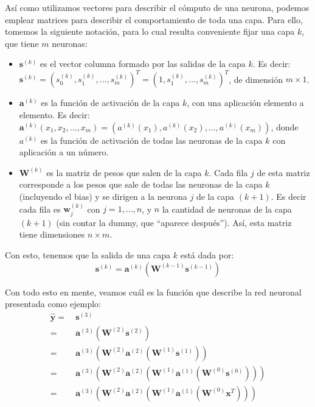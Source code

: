 \documentclass[../../main.tex]{subfiles}
\begin{document}
Así como utilizamos vectores para describir el cómputo de una neurona, podemos emplear
matrices para describir el comportamiento de toda una capa. Para ello, tomemos la siguiente
notación, para lo cual resulta conveniente fijar una capa \(k\), que tiene \(m\)
neuronas:
\begin{itemize}[itemsep=0.1cm]
    \item \(\bm{s}^{(k)}\) es el vector columna formado por las salidas de la capa
    \(k\). Es decir: \(\bm{s}^{(k)} = (s_0^{(k)}, s_1^{(k)}, ..., s_m^{(k)})^T = (1,
    s_1^{(k)}, ..., s_m^{(k)})^T\), de dimensión \(m \times 1\).
    \item \(\bm{a}^{(k)}\) es la función de activación de la capa \(k\), con una aplicación
    elemento a elemento. Es decir: \(\bm{a}^{(k)}(x_1, x_2, ..., x_m) = (a^{(k)}(x_1),
    a^{(k)}(x_2), ..., a^{(k)}(x_m))\), donde \(a^{(k)}\) es la función de activación
    de todas las neuronas de la capa \(k\) con aplicación a un número.
    \item \(\bm{W}^{(k)}\) es la matriz de pesos que salen de la capa \(k\). Cada fila
    \(j\) de esta matriz corresponde a los pesos que sale de todas las neuronas de la capa
    \(k\) (incluyendo el bias) y se dirigen a la neurona \(j\) de la capa \((k+1)\). Es
    decir cada fila es \(\bm{w}^{(k)}_j\) con \(j = 1,...,n\), y \(n\) la cantidad de
    neuronas de la capa \((k+1)\) (sin contar la dummy, que ``aparece después''). Así,
    esta matriz tiene dimensiones \(n \times m\).
\end{itemize}
Con esto, tenemos que la salida de una capa \(k\) está dada por:
\[
    \bm{s}^{(k)} = \bm{a}^{(k)} \left( \bm{W}^{(k-1)} \bm{s}^{(k-1)} \right)
\]

Con todo esto en mente, veamos cuál es la función que describe la red neuronal presentada
como ejemplo:
\begin{align*}
    \bm{\hat{y}} =\ & \bm{s}^{(3)} \\
        =\ & \bm{a}^{(3)} \left( \bm{W}^{(2)} \bm{s}^{(2)} \right) \\
        =\ & \bm{a}^{(3)} \left(
            \bm{W}^{(2)} \bm{a}^{(2)} \left(
                \bm{W}^{(1)} \bm{s}^{(1)}
            \right)
        \right) \\
        =\ & \bm{a}^{(3)} \left(
            \bm{W}^{(2)} \bm{a}^{(2)} \left(
                \bm{W}^{(1)} \bm{a}^{(1)} \left( \bm{W}^{(0)} \bm{s}^{(0)} \right)
            \right)
        \right) \\
        =\ & \bm{a}^{(3)} \left(
            \bm{W}^{(2)} \bm{a}^{(2)} \left(
                \bm{W}^{(1)} \bm{a}^{(1)} \left( \bm{W}^{(0)} \bm{x}^T \right)
            \right)
        \right)
\end{align*}
\end{document}
